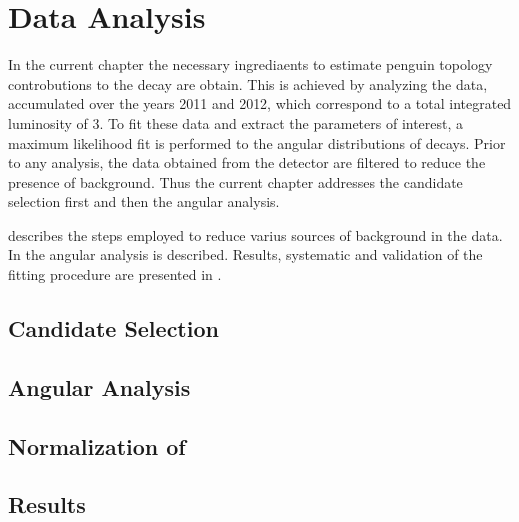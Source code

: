 \chapter{Data Analysis}
\label{Data_Analysis}

In the current chapter the necessary ingrediaents to estimate penguin topology controbutions to the \BsJpsiPhi 
decay are obtain. This is achieved by analyzing the \runone \lhcb data, accumulated over the years 2011 and 2012,
which correspond to a total integrated luminosity of 3\invfb. To fit these data and extract the parameters of 
interest, a maximum likelihood fit is performed to the angular distributions of \BsJpsiKst decays.
Prior to any analysis, the data obtained from the detector are filtered to reduce the presence of
background. Thus the current chapter addresses the \Bs candidate selection first and then the angular analysis.

 describes the steps employed to reduce varius sources of background in the data. 
In  the angular analysis is described. Results, systematic and validation of 
the fitting procedure are presented in .    

\section{Candidate Selection}
\label{Event_Selection}


\section{Angular Analysis}
\label{Angular_Analysis}


\section{Normalization of \BsJpsiKpi}
\label{Normalization}


\section{Results}
\label{Results}

